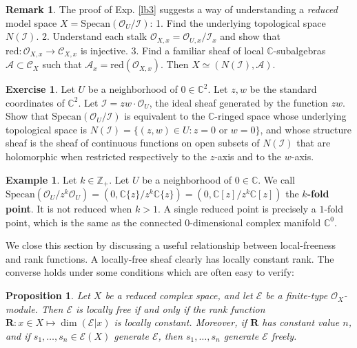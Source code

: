 \documentclass[12pt,b5paper,notitlepage]{report}
\theoremstyle{definition}
\newtheorem{eg}[df]{Example}
\newtheorem{exe}[df]{Exercise}
\newtheorem{rem}[df]{Remark}
\theoremstyle{plain}
\newtheorem{pp}[df]{Proposition}
\newcommand{\mc}{\mathcal}
\newcommand{\scr}{\mathscr}
\newcommand{\Cbb}{\mathbb C}
\newcommand{\Zbb}{\mathbb Z}
\newcommand{\Rbf}{\mathbf R}
\newcommand{\Specan}{\mathrm{Specan}}
\newcommand{\red}{\mathrm{red}}
\numberwithin{equation}{section}
\begin{document}
\begin{rem}
The proof of Exp. \ref{lb3} suggests a way of understanding a \emph{reduced} model space $X=\Specan(\scr O_U/\mc I)$: 1. Find the underlying topological space $N(\mc I)$. 2. Understand each stalk $\scr O_{X,x}=\scr O_{U,x}/\mc I_x$ and show that $\red:\scr O_{X,x}\rightarrow\scr C_{X,x}$ is injective. 3. Find a familiar sheaf of local $\Cbb$-subalgebras $\scr A\subset\scr C_X$ such that $\scr A_x=\red(\scr O_{X,x})$. Then $X\simeq (N(\mc I),\scr A)$.
\end{rem}


\begin{exe}
Let $U$ be a neighborhood of $0\in\Cbb^2$. Let $z,w$ be the standard coordinates of $\Cbb^2$. Let $\mc I=zw\cdot \scr O_U$, the ideal sheaf generated by the function $zw$. Show that $\Specan(\scr O_U/\mc I)$ is equivalent to the $\Cbb$-ringed space whose underlying topological space  is $N(\mc I)=\{(z,w)\in U:z=0\text{ or }w=0\}$, and whose structure sheaf is the sheaf of continuous functions on open subsets of $N(\mc I)$ that are holomorphic when restricted respectively to the $z$-axis and to the $w$-axis.
\end{exe}


\begin{eg}
Let $k\in\Zbb_+$. Let $U$ be a neighborhood of $0\in\Cbb$. We call $\Specan(\scr O_U/z^k\scr O_U)=(0,\Cbb\{z\}/z^k\Cbb\{z\})=(0,\Cbb[z]/z^k\Cbb[z])$ the \textbf{$k$-fold point}. It is not reduced when $k>1$. A single reduced point is precisely a $1$-fold point, which is the same as the connected $0$-dimensional complex manifold $\Cbb^0$.  
\end{eg}




We close this section by discussing a useful relationship between local-freeness and rank functions. A locally-free sheaf clearly has locally constant rank. The converse holds under some conditions which are often easy to verify:



\begin{pp}\label{lb65}
Let $X$ be a {\color{red}reduced} complex space, and let $\scr E$ be a finite-type $\scr O_X$-module. Then $\scr E$ is locally free if and only if the rank function $\Rbf:x\in X\mapsto \dim(\scr E|x)$ is locally constant. Moreover, if $\Rbf$ has constant value $n$, and if $s_1,\dots,s_n\in\scr E(X)$ generate $\scr E$, then $s_1,\dots,s_n$ generate $\scr E$ freely.
\end{pp}
\end{document}

